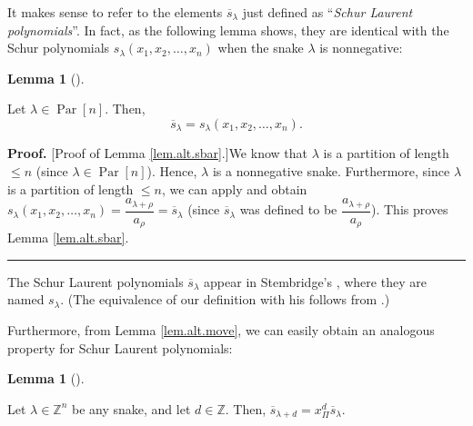 \documentclass[numbers=enddot,12pt,final,onecolumn,notitlepage]{scrartcl}%
\theoremstyle{definition}
\newtheorem{lem}[theo]{Lemma}
\newenvironment{lemma}[1][]
{\begin{lem}[#1]\begin{leftbar}}
{\end{leftbar}\end{lem}}
\newenvironment{proof}[1][Proof]{\noindent\textbf{#1.} }{\ \rule{0.5em}{0.5em}}
\begin{document}
It makes sense to refer to the elements $\overline{s}_{\lambda}$ just defined
as \textquotedblleft\textit{Schur Laurent polynomials}\textquotedblright. In
fact, as the following lemma shows, they are identical with the Schur
polynomials $s_{\lambda}\left(  x_{1},x_{2},\ldots,x_{n}\right)  $ when the
snake $\lambda$ is nonnegative:

\begin{lemma}
\label{lem.alt.sbar}Let $\lambda\in\operatorname*{Par}\left[  n\right]  $.
Then,%
\[
\overline{s}_{\lambda}=s_{\lambda}\left(  x_{1},x_{2},\ldots,x_{n}\right)  .
\]

\end{lemma}

\begin{proof}
[Proof of Lemma \ref{lem.alt.sbar}.]We know that $\lambda$ is a partition of
length $\leq n$ (since $\lambda\in\operatorname*{Par}\left[  n\right]  $).
Hence, $\lambda$ is a nonnegative snake. Furthermore, since $\lambda$ is a
partition of length $\leq n$, we can apply \cite[Corollary 2.6.7]{GriRei} and
obtain $s_{\lambda}\left(  x_{1},x_{2},\ldots,x_{n}\right)  =\dfrac
{a_{\lambda+\rho}}{a_{\rho}}=\overline{s}_{\lambda}$ (since $\overline
{s}_{\lambda}$ was defined to be $\dfrac{a_{\lambda+\rho}}{a_{\rho}}$). This
proves Lemma \ref{lem.alt.sbar}.
\end{proof}

The Schur Laurent polynomials $\overline{s}_{\lambda}$ appear in Stembridge's
\cite{Stembr87}, where they are named $s_{\lambda}$. (The equivalence of our
definition with his follows from \cite[Theorem 7.1]{Stembr87}.)

Furthermore, from Lemma \ref{lem.alt.move}, we can easily obtain an analogous
property for Schur Laurent polynomials:

\begin{lemma}
\label{lem.alt.smove}Let $\lambda\in\mathbb{Z}^{n}$ be any snake, and let
$d\in\mathbb{Z}$. Then, $\overline{s}_{\lambda+d}=x_{\Pi}^{d}\overline
{s}_{\lambda}$.
\end{lemma}
\end{document}
